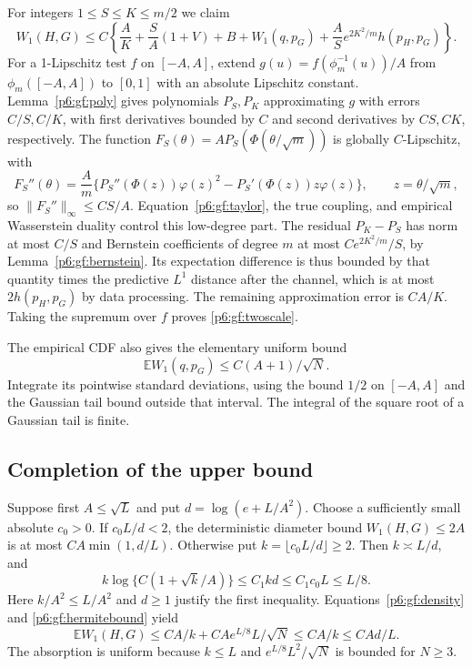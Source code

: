 \documentclass[11pt,a4paper]{article}
\theoremstyle{definition}
\theoremstyle{remark}
\numberwithin{equation}{section}
\begin{document}
For integers $1\le S\le K\le m/2$ we claim
\begin{equation}\label{p6:gf:twoscale}
 W_1(H,G)\le C\left\{\frac A K+\frac S A(1+V)+B
       +W_1(q,p_G)+\frac A S e^{2K^2/m}h(p_H,p_G)\right\}.
\end{equation}
For a 1-Lipschitz test $f$ on $[-A,A]$, extend
$g(u)=f(\phi_m^{-1}(u))/A$ from $\phi_m([-A,A])$ to $[0,1]$
with an absolute Lipschitz constant.  Lemma~\ref{p6:gf:poly} gives
polynomials $P_S,P_K$ approximating $g$ with errors $C/S,C/K$,
with first derivatives bounded by $C$ and second derivatives by
$CS,CK$, respectively.
The function $F_S(\theta)=AP_S(\Phi(\theta/\sqrt m))$ is globally
$C$-Lipschitz, with
\[
 F_S''(\theta)=\frac A m
 \{P_S''(\Phi(z))\varphi(z)^2-P_S'(\Phi(z))z\varphi(z)\},
 \qquad z=\theta/\sqrt m,
\]
so $\|F_S''\|_\infty\le CS/A$.
Equation~\eqref{p6:gf:taylor}, the true coupling, and empirical
Wasserstein duality control this low-degree part.
The residual $P_K-P_S$ has norm at most $C/S$ and Bernstein
coefficients of degree $m$ at most $Ce^{2K^2/m}/S$, by
Lemma~\ref{p6:gf:bernstein}.  Its expectation difference is thus bounded
by that quantity times the predictive $L^1$ distance after the
channel, which is at most $2h(p_H,p_G)$ by data processing.
The remaining approximation error is $CA/K$.
Taking the supremum over $f$ proves \eqref{p6:gf:twoscale}.

The empirical CDF also gives the elementary uniform bound
\begin{equation}\label{p6:gf:empirical}
                   \mathbb E W_1(q,p_G)\le C(A+1)/\sqrt N.
\end{equation}
Integrate its pointwise standard deviations, using the bound $1/2$
on $[-A,A]$ and the Gaussian tail bound outside that interval.
The integral of the square root of a Gaussian tail is finite.

\subsection{Completion of the upper bound}

Suppose first $A\le\sqrt L$ and put $d=\log(e+L/A^2)$.
Choose a sufficiently small absolute $c_0>0$.
If $c_0L/d<2$, the deterministic diameter bound $W_1(H,G)\le2A$
is at most $C A\min(1,d/L)$.
Otherwise put $k=\lfloor c_0L/d\rfloor\ge2$.
Then $k\asymp L/d$, and
\[
 k\log\{C(1+\sqrt k/A)\}\le C_1kd\le C_1c_0L\le L/8.
\]
Here $k/A^2\le L/A^2$ and $d\ge1$ justify the first inequality.
Equations~\eqref{p6:gf:density} and \eqref{p6:gf:hermitebound} yield
\[
 \mathbb EW_1(H,G)\le CA/k+CAe^{L/8}L/\sqrt N
                         \le CA/k\le CA d/L.
\]
The absorption is uniform because $k\le L$ and
$e^{L/8}L^2/\sqrt N$ is bounded for $N\ge3$.
\end{document}
